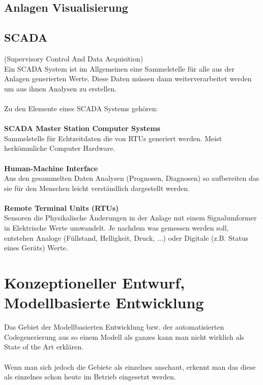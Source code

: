 \subsection{Anlagen Visualisierung}
\subsection{SCADA}
(Supervisory Control And Data Acquisition)\\
Ein SCADA System ist im Allgemeinen eine Sammelstelle für alle aus der Anlagen generierten Werte. Diese Daten müssen dann weiterverarbeitet werden um aus ihnen Analysen zu erstellen.\\
\\
Zu den Elemente eines SCADA Systems gehören:\\
\\
\textbf{SCADA Master Station Computer Systems}\\
Sammelstelle für Echtzeitdaten die von RTUs generiert werden. Meist herkömmliche Computer Hardware.\\
\\
\textbf{Human-Machine Interface}\\
Aus den gesammelten Daten Analysen (Prognosen, Diagnosen) so aufbereiten das sie für den Menschen leicht verständlich dargestellt werden.\\
\\
\textbf{Remote Terminal Units (RTUs)}\\
Sensoren die Physikalische Änderungen in der Anlage mit einem Signalumformer in Elektrische Werte umwandelt. Je nachdem was gemessen werden soll, entstehen Analoge (Füllstand, Helligkeit, Druck, ...) oder Digitale (z.B. Status eines Geräts) Werte.\\

\section{Konzeptioneller Entwurf, Modellbasierte Entwicklung}
Das Gebiet der Modellbasierten Entwicklung bzw. der automatisierten Codegenerierung aus so einem Modell als ganzes kann man nicht wirklich als State of the Art erklären.\\
\\
Wenn man sich jedoch die Gebiete als einzelnes anschaut, erkennt man das diese als einzelnes schon heute im Betrieb eingesetzt werden.
